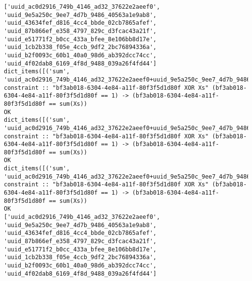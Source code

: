 \documentclass[11pt]{article}
\begin{document}
\begin{verbatim}
['uuid_ac0d2916_749b_4146_ad32_37622e2aeef0', 'uuid_9e5a250c_9ee7_4d7b_9486_40563a1e9ab8', 'uuid_43634fef_d816_4cc4_bbde_02cb7865afef', 'uuid_87b866ef_e358_4797_829c_d3fcac43a21f', 'uuid_e51771f2_b0cc_433a_bfee_8e106bb8d17e', 'uuid_1cb2b338_f05e_4ccb_9df2_2bc76894336a', 'uuid_b2f0093c_60b1_40a0_98d6_ab392dcc74cc', 'uuid_4f02dab8_6169_4f8d_9488_039a26f4fd44']
dict_items([('sum', 'uuid_ac0d2916_749b_4146_ad32_37622e2aeef0+uuid_9e5a250c_9ee7_4d7b_9486_40563a1e9ab8+uuid_43634fef_d816_4cc4_bbde_02cb7865afef+uuid_87b866ef_e358_4797_829c_d3fcac43a21f+uuid_e51771f2_b0cc_433a_bfee_8e106bb8d17e+uuid_1cb2b338_f05e_4ccb_9df2_2bc76894336a+uuid_b2f0093c_60b1_40a0_98d6_ab392dcc74cc+uuid_4f02dab8_6169_4f8d_9488_039a26f4fd44')])
constraint :: "bf3ab018-6304-4e84-a11f-80f3f5d1d80f XOR Xs" (bf3ab018-6304-4e84-a11f-80f3f5d1d80f == 1) -> (bf3ab018-6304-4e84-a11f-80f3f5d1d80f == sum(Xs))
OK
dict_items([('sum', 'uuid_ac0d2916_749b_4146_ad32_37622e2aeef0+uuid_9e5a250c_9ee7_4d7b_9486_40563a1e9ab8+uuid_43634fef_d816_4cc4_bbde_02cb7865afef+uuid_87b866ef_e358_4797_829c_d3fcac43a21f+uuid_e51771f2_b0cc_433a_bfee_8e106bb8d17e+uuid_1cb2b338_f05e_4ccb_9df2_2bc76894336a+uuid_b2f0093c_60b1_40a0_98d6_ab392dcc74cc+uuid_4f02dab8_6169_4f8d_9488_039a26f4fd44')])
constraint :: "bf3ab018-6304-4e84-a11f-80f3f5d1d80f XOR Xs" (bf3ab018-6304-4e84-a11f-80f3f5d1d80f == 1) -> (bf3ab018-6304-4e84-a11f-80f3f5d1d80f == sum(Xs))
OK
dict_items([('sum', 'uuid_ac0d2916_749b_4146_ad32_37622e2aeef0+uuid_9e5a250c_9ee7_4d7b_9486_40563a1e9ab8+uuid_43634fef_d816_4cc4_bbde_02cb7865afef+uuid_87b866ef_e358_4797_829c_d3fcac43a21f+uuid_e51771f2_b0cc_433a_bfee_8e106bb8d17e+uuid_1cb2b338_f05e_4ccb_9df2_2bc76894336a+uuid_b2f0093c_60b1_40a0_98d6_ab392dcc74cc+uuid_4f02dab8_6169_4f8d_9488_039a26f4fd44')])
constraint :: "bf3ab018-6304-4e84-a11f-80f3f5d1d80f XOR Xs" (bf3ab018-6304-4e84-a11f-80f3f5d1d80f == 1) -> (bf3ab018-6304-4e84-a11f-80f3f5d1d80f == sum(Xs))
OK
['uuid_ac0d2916_749b_4146_ad32_37622e2aeef0', 'uuid_9e5a250c_9ee7_4d7b_9486_40563a1e9ab8', 'uuid_43634fef_d816_4cc4_bbde_02cb7865afef', 'uuid_87b866ef_e358_4797_829c_d3fcac43a21f', 'uuid_e51771f2_b0cc_433a_bfee_8e106bb8d17e', 'uuid_1cb2b338_f05e_4ccb_9df2_2bc76894336a', 'uuid_b2f0093c_60b1_40a0_98d6_ab392dcc74cc', 'uuid_4f02dab8_6169_4f8d_9488_039a26f4fd44']

\end{verbatim}
\end{document}
